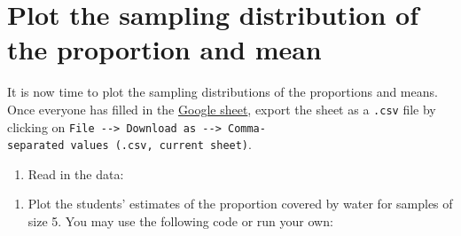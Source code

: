 \documentclass[letterpaper,9pt,twoside,printwatermark=false]{pinp}
\providecommand{\tightlist}{%
  \setlength{\itemsep}{0pt}\setlength{\parskip}{0pt}}
\begin{document}
\section{Plot the sampling distribution of the proportion and
mean}\label{plot-the-sampling-distribution-of-the-proportion-and-mean}

It is now time to plot the sampling distributions of the proportions and
means. Once everyone has filled in the
\href{https://docs.google.com/spreadsheets/d/1Mnxeq9nQcTdQycZ7S_62fYFiNC5_a3fibsyodzfwO58/edit?usp=sharing}{Google
sheet}, export the sheet as a \texttt{.csv} file by clicking on
\texttt{File\ -\/-\textgreater{}\ Download\ as\ -\/-\textgreater{}\ Comma-separated\ values\ (.csv,\ current\ sheet)}.

\begin{enumerate}
\def\labelenumi{\arabic{enumi}.}
\tightlist
\item
  Read in the data:
\end{enumerate}

\begin{Shaded}
\begin{Highlighting}[]
\StringTok{ }\NormalTok{(}\NormalTok{, }\NormalTok{)}

\StringTok{ }
\end{Highlighting}
\end{Shaded}

\begin{enumerate}
\def\labelenumi{\arabic{enumi}.}
\setcounter{enumi}{1}
\tightlist
\item
  Plot the students' estimates of the proportion covered by water for
  samples of size 5. You may use the following code or run your own:
\end{enumerate}

\begin{Shaded}
\begin{Highlighting}[]
\NormalTok{(}\NormalTok{(water_results[,}\NormalTok{]), }
      \NormalTok{(}\NormalTok{,}\NormalTok{),}
      \NormalTok{,}
      \NormalTok{, }
      \NormalTok{(}\OperatorTok{/}\NormalTok{), }
      \NormalTok{)}
\end{Highlighting}
\end{Shaded}
\end{document}
